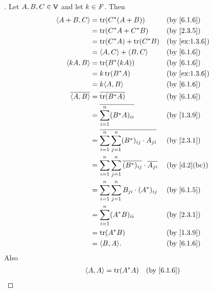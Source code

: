 \begin{proof}[]
	Let \(A, B, C \in \mathsf{V}\) and let \(k \in \mathit{F}\).
	Then
	\begin{align*}
		\inn{A + B, C}    & = \tr(C^* (A + B))                                                      &  & \by{6.1.6}    \\
		                  & = \tr(C^* A + C^* B)                                                    &  & \by{2.3.5}    \\
		                  & = \tr(C^* A) + \tr(C^* B)                                               &  & \by{ex:1.3.6} \\
		                  & = \inn{A, C} + \inn{B, C}                                               &  & \by{6.1.6}    \\
		\inn{kA, B}       & = \tr(B^* (kA))                                                         &  & \by{6.1.6}    \\
		                  & = k \tr(B^* A)                                                          &  & \by{ex:1.3.6} \\
		                  & = k \inn{A, B}                                                          &  & \by{6.1.6}    \\
		\conj{\inn{A, B}} & = \conj{\tr(B^* A)}                                                     &  & \by{6.1.6}    \\
		                  & = \conj{\sum_{i = 1}^n (B^* A)_{i i}}                                   &  & \by{1.3.9}    \\
		                  & = \conj{\sum_{i = 1}^n \sum_{j = 1}^n (B^*)_{i j} \cdot A_{j i}}        &  & \by{2.3.1}    \\
		                  & = \sum_{i = 1}^n \sum_{j = 1}^n \conj{(B^*)_{i j}} \cdot \conj{A_{j i}} &  & \by{d.2}[bc]  \\
		                  & = \sum_{i = 1}^n \sum_{j = 1}^n B_{j i} \cdot (A^*)_{i j}               &  & \by{6.1.5}    \\
		                  & = \sum_{i = 1}^n (A^* B)_{i i}                                          &  & \by{2.3.1}    \\
		                  & = \tr(A^* B)                                                            &  & \by{1.3.9}    \\
		                  & = \inn{B, A}.                                                           &  & \by{6.1.6}
	\end{align*}
	Also
	\begin{align*}
		\inn{A, A} & = \tr(A^* A)                                           &  & \by{6.1.6} \\

\end{align*}
\end{proof}
